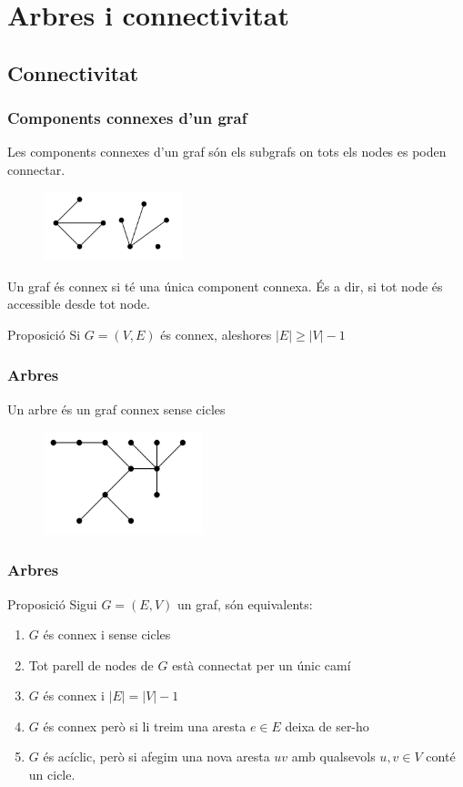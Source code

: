 \documentclass{beamer}
\begin{document}
\section{Arbres i connectivitat}

\subsection{Connectivitat}

\begin{frame}
\frametitle{Components connexes d'un graf}
Les components connexes d'un graf són els subgrafs on tots els nodes es poden connectar.

\begin{figure}[h]
\centering
\includegraphics[height=2cm]{connex1}
\end{figure}
Un graf és connex si té una única component connexa. És a dir, si tot node és accessible desde tot node. 
\begin{block}{Proposició }
Si $G=(V,E)$ és connex, aleshores $|E|\geq |V| - 1$
\end{block}
\end{frame}

\begin{frame}
\frametitle{Arbres}
Un arbre és un graf connex sense cicles
\begin{figure}[h]
\centering
\includegraphics[height=3cm]{connex2}
\end{figure}
\end{frame}

\begin{frame}
\frametitle{Arbres}
\begin{block}{Proposició}
Sigui $G = (E,V)$ un graf, són equivalents:
\begin{enumerate}
\item $G$ és connex i sense cicles
\item Tot parell de nodes de $G$ està connectat per un únic camí
\item $G$ és connex i $|E|=|V| - 1$
\item $G$ és connex però si li treim una aresta $e\in E$ deixa de ser-ho
\item $G$ és acíclic, però si afegim una nova aresta $uv$ amb qualsevols $u,v\in V$ conté un cicle.
\end{enumerate}

\end{block}

\end{frame}
\end{document}
